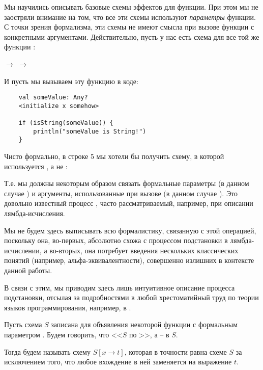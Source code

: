 \label{section-arguments-substitution}

Мы научились описывать базовые схемы эффектов для функции. При этом мы не заостряли внимание на том, что все эти схемы используют \emph{параметры} функции. С точки зрения формализма, эти схемы не имеют смысла при вызове функции с конкретными аргументами. Действительно, пусть у нас есть схема для все той же функции :

{
         $\rightarrow$ 
         $\rightarrow$ 
}
{}

И пусть мы вызываем эту функцию в коде:

\begin{verbatim}
    val someValue: Any?
    <initialize x somehow>
    
    if (isString(someValue)) {
        println("someValue is String!")
    }
\end{verbatim}

Чисто формально, в строке 5 мы хотели бы получить схему, в которой используется , а не :


Т.е. мы должны некоторым образом связать формальные параметры (в данном случае ) и аргументы, использованные при вызове (в данном случае ). Это довольно известный процесс , часто рассматриваемый, например, при описании лямбда-исчисления. 

Мы не будем здесь выписывать всю формалистику, связанную с этой операцией, поскольку она, во-первых, абсолютно схожа с процессом подстановки в лямбда-исчислении, а во-вторых, она потребует введения нескольких классических понятий (например, альфа-эквивалентности), совершенно излишних в контексте данной работы. 

В связи с этим, мы приводим здесь лишь интуитивное описание процесса подстановки, отсылая за подробностями в любой хрестоматийный труд по теории языков программирования, например, в \cite{TAPL}.

\begin{definition}
     Пусть схема $S$ записана для объявления некоторой функции с формальным параметром . Будем говорить, что <<$S$  по >>, а  --  в $S$.
     
     Тогда  будем называть схему $S[x \to t]$, которая в точности равна схеме $S$ за исключением того, что любое вхождение  в ней заменяется на выражение $t$. 
\end{definition}

